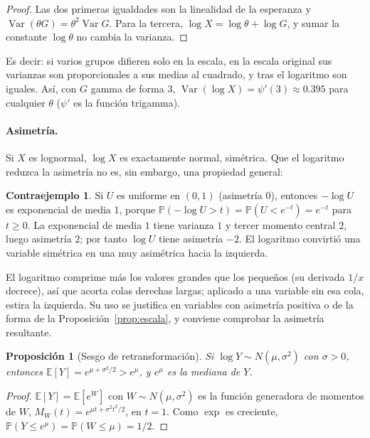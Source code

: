 \documentclass[11pt,a4paper]{article}
\theoremstyle{plain}
\newtheorem{proposicion}[teorema]{Proposición}
\theoremstyle{definition}
\newtheorem{contraejemplo}[teorema]{Contraejemplo}
\theoremstyle{remark}
\newcommand{\E}{\mathbb{E}}
\newcommand{\Prob}{\mathbb{P}}
\newcommand{\Var}{\operatorname{Var}}
\newcommand{\1}{\mathbf{1}}
\begin{document}
\begin{proof}
Las dos primeras igualdades son la linealidad de la esperanza y
$\Var(\theta G)=\theta^2\Var G$. Para la tercera,
$\log X=\log\theta+\log G$, y sumar la constante $\log\theta$ no cambia la
varianza.
\end{proof}

Es decir: si varios grupos difieren solo en la escala, en la escala
original sus varianzas son proporcionales a sus medias al cuadrado, y tras
el logaritmo son iguales. Así, con $G$ gamma de forma $3$, $\Var(\log
X)=\psi'(3)\approx0.395$ para cualquier $\theta$ ($\psi'$ es la función
trigamma).

\paragraph{Asimetría.} Si $X$ es lognormal, $\log X$ es exactamente
normal, simétrica. Que el logaritmo reduzca la asimetría no es, sin
embargo, una propiedad general:

\begin{contraejemplo}\label{ce:logunif}
Si $U$ es uniforme en $(0,1)$ (asimetría $0$), entonces $-\log U$ es
exponencial de media $1$, porque $\Prob(-\log U>t)=\Prob(U<e^{-t})=e^{-t}$
para $t\ge0$. La exponencial de media $1$ tiene varianza $1$ y tercer
momento central $2$, luego asimetría $2$; por tanto $\log U$ tiene
asimetría $-2$. El logaritmo convirtió una variable simétrica en una muy
asimétrica hacia la izquierda.
\end{contraejemplo}

El logaritmo comprime más los valores grandes que los pequeños (su
derivada $1/x$ decrece), así que acorta colas derechas largas; aplicado a
una variable sin esa cola, estira la izquierda. Su uso se justifica en
variables con asimetría positiva o de la forma de la
Proposición~\ref{prop:escala}, y conviene comprobar la asimetría resultante.

\begin{proposicion}[Sesgo de retransformación]\label{prop:retrans}
Si $\log Y\sim N(\mu,\sigma^2)$ con $\sigma>0$, entonces
$\E[Y]=e^{\mu+\sigma^2/2}>e^{\mu}$, y $e^\mu$ es la mediana de $Y$.
\end{proposicion}

\begin{proof}
$\E[Y]=\E[e^W]$ con $W\sim N(\mu,\sigma^2)$ es la función generadora de
momentos de $W$, $M_W(t)=e^{\mu t+\sigma^2t^2/2}$, en $t=1$. Como $\exp$ es
creciente, $\Prob(Y\le e^\mu)=\Prob(W\le\mu)=1/2$.
\end{proof}
\end{document}
